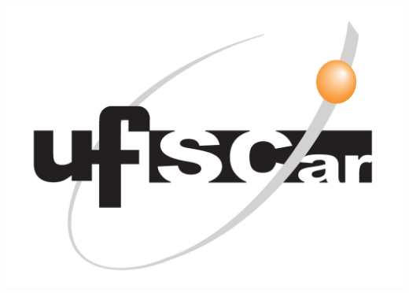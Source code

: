 \documentclass[dissertmst]{ufscar}
\begin{document}
\begin{folhadeaprovacao}
   \noindent\begin{minipage}{0.3\textwidth}
      \includegraphics[width=\linewidth]{lib/ufscar.pdf}
      \end{minipage}%
      \hfill%
      \begin{minipage}{0.7\textwidth}\center
      \imprimirinstituicao
   \end{minipage}


   

\end{folhadeaprovacao}
\end{document}
